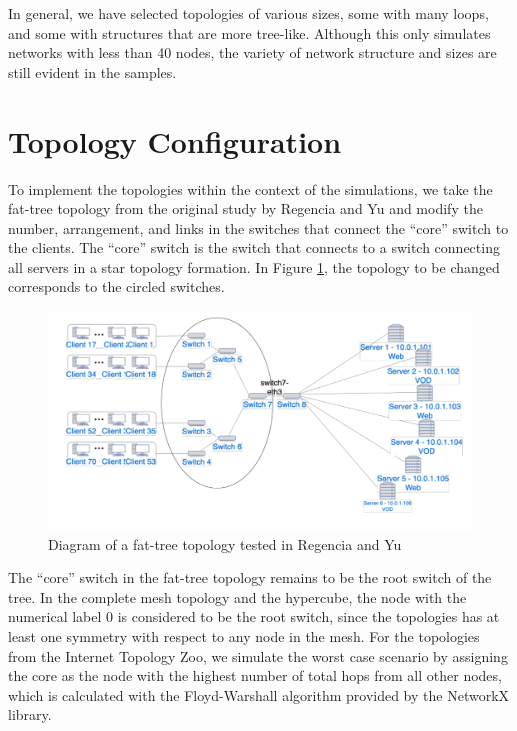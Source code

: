 In general, we have selected topologies of various sizes, some with many loops, and some with structures that are more tree-like. Although this only simulates networks with less than 40 nodes, the variety of network structure and sizes are still evident in the samples.

\section{Topology Configuration}
To implement the topologies within the context of the simulations, we take the fat-tree topology from the original study by Regencia and Yu and modify the number, arrangement, and links in the switches that connect the ``core'' switch to the clients. The ``core'' switch is the switch that connects to a switch connecting all servers in a star topology formation. In Figure \ref{fig:original_topology}, the topology to be changed corresponds to the circled switches.

\begin{figure}[htbp]
    \centering
    \includegraphics[width=\textwidth]{Figures/original_topology.png}
    \caption{Diagram of a fat-tree topology tested in Regencia and Yu}
    \label{fig:original_topology}
\end{figure}

The ``core'' switch in the fat-tree topology remains to be the root switch of the tree. In the complete mesh topology and the hypercube, the node with the numerical label $0$ is considered to be the root switch, since the topologies has at least one symmetry with respect to any node in the mesh. For the topologies from the Internet Topology Zoo, we simulate the worst case scenario by assigning the core as the node with the highest number of total hops from all other nodes, which is calculated with the Floyd-Warshall algorithm provided by the NetworkX library.

